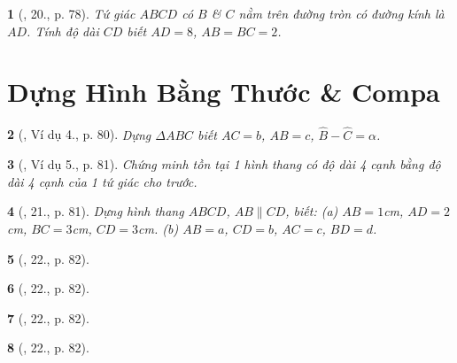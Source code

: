 \documentclass{article}
\newtheorem{baitoan}{}
\begin{document}
\begin{baitoan}[\cite{Binh_Toan_8_tap_1}, 20., p. 78]
	Tứ giác $ABCD$ có $B$ \& $C$ nằm trên đường tròn có đường kính là $AD$. Tính độ dài $CD$ biết $AD = 8$, $AB = BC = 2$.
\end{baitoan}


\section{Dựng Hình Bằng Thước \& Compa}

\begin{baitoan}[\cite{Binh_Toan_8_tap_1}, Ví dụ 4., p. 80]
	Dựng $\Delta ABC$ biết $AC = b$, $AB = c$, $\widehat{B} - \widehat{C} = \alpha$.
\end{baitoan}

\begin{baitoan}[\cite{Binh_Toan_8_tap_1}, Ví dụ 5., p. 81]
	Chứng minh tồn tại 1 hình thang có độ dài 4 cạnh bằng độ dài 4 cạnh của 1 tứ giác cho trước.
\end{baitoan}

\begin{baitoan}[\cite{Binh_Toan_8_tap_1}, 21., p. 81]
	Dựng hình thang $ABCD$, $AB\parallel CD$, biết: (a) $AB = 1${\rm cm}, $AD = 2${\rm cm}, $BC = 3${\rm cm}, $CD = 3${\rm cm}. (b) $AB = a$, $CD = b$, $AC = c$, $BD = d$.
\end{baitoan}

\begin{baitoan}[\cite{Binh_Toan_8_tap_1}, 22., p. 82]
	
\end{baitoan}

\begin{baitoan}[\cite{Binh_Toan_8_tap_1}, 22., p. 82]
	
\end{baitoan}

\begin{baitoan}[\cite{Binh_Toan_8_tap_1}, 22., p. 82]
	
\end{baitoan}

\begin{baitoan}[\cite{Binh_Toan_8_tap_1}, 22., p. 82]
	
\end{baitoan}




\printbibliography[heading=bibintoc]
	
\end{document}

